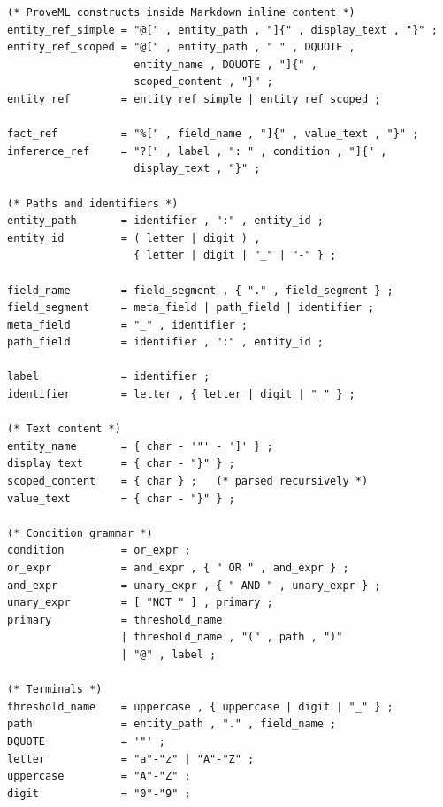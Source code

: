\documentclass[11pt,a4paper]{article}
\begin{document}
\begin{lstlisting}
(* ProveML constructs inside Markdown inline content *)
entity_ref_simple = "@[" , entity_path , "]{" , display_text , "}" ;
entity_ref_scoped = "@[" , entity_path , " " , DQUOTE ,
                    entity_name , DQUOTE , "]{" ,
                    scoped_content , "}" ;
entity_ref        = entity_ref_simple | entity_ref_scoped ;

fact_ref          = "%[" , field_name , "]{" , value_text , "}" ;
inference_ref     = "?[" , label , ": " , condition , "]{" ,
                    display_text , "}" ;

(* Paths and identifiers *)
entity_path       = identifier , ":" , entity_id ;
entity_id         = ( letter | digit ) ,
                    { letter | digit | "_" | "-" } ;

field_name        = field_segment , { "." , field_segment } ;
field_segment     = meta_field | path_field | identifier ;
meta_field        = "_" , identifier ;
path_field        = identifier , ":" , entity_id ;

label             = identifier ;
identifier        = letter , { letter | digit | "_" } ;

(* Text content *)
entity_name       = { char - '"' - ']' } ;
display_text      = { char - "}" } ;
scoped_content    = { char } ;   (* parsed recursively *)
value_text        = { char - "}" } ;

(* Condition grammar *)
condition         = or_expr ;
or_expr           = and_expr , { " OR " , and_expr } ;
and_expr          = unary_expr , { " AND " , unary_expr } ;
unary_expr        = [ "NOT " ] , primary ;
primary           = threshold_name
                  | threshold_name , "(" , path , ")"
                  | "@" , label ;

(* Terminals *)
threshold_name    = uppercase , { uppercase | digit | "_" } ;
path              = entity_path , "." , field_name ;
DQUOTE            = '"' ;
letter            = "a"-"z" | "A"-"Z" ;
uppercase         = "A"-"Z" ;
digit             = "0"-"9" ;
\end{lstlisting}
\end{document}
